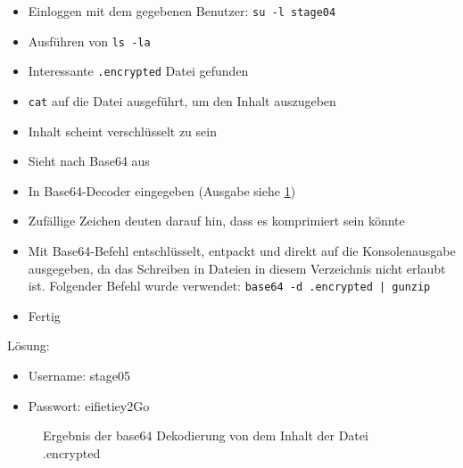 \documentclass[12pt, a4paper, titlepage, oneside]{scrartcl}
\begin{document}
	\begin{itemize}
		\item Einloggen mit dem gegebenen Benutzer: \lstinline{su -l stage04}

		\item Ausführen von \lstinline{ls -la}

		\item Interessante \lstinline{.encrypted} Datei gefunden

		\item \lstinline{cat} auf die Datei ausgeführt, um den Inhalt auszugeben

		\item Inhalt scheint verschlüsselt zu sein

		\item Sieht nach Base64 aus

		\item In Base64-Decoder eingegeben (Ausgabe siehe
			\ref{fig:stageeeee_base64_output})

		\item Zufällige Zeichen deuten darauf hin, dass es komprimiert sein könnte

		\item Mit Base64-Befehl entschlüsselt, entpackt und direkt auf die
			Konsolenausgabe ausgegeben, da das Schreiben in Dateien in diesem Verzeichnis
			nicht erlaubt ist. Folgender Befehl wurde verwendet: \lstinline{base64 -d .encrypted | gunzip}

		\item Fertig
	\end{itemize}

	Lösung:
	\begin{itemize}
		\item Username: stage05

		\item Passwort: eifietiey2Go
	\end{itemize}

	\begin{figure}[h!]
		\centering
		\caption{Ergebnis der base64 Dekodierung von dem Inhalt der Datei .encrypted}
		\label{fig:stageeeee_base64_output}
	\end{figure}
\end{document}
